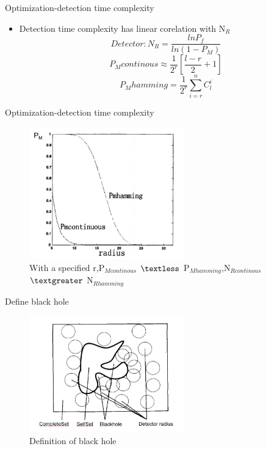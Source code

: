 \begin{frame}{Optimization-detection time complexity}
  \begin{itemize}
  \item{
     Detection time complexity has linear corelation with N$_R$\\
  \begin{equation}
     Detector:N_R=\frac{lnP_f}{ln(1-P_M)}
  \end{equation}  
  \begin{equation}
     P_Mcontinous \approx \frac{1}{2^r}[\frac{l-r}{2}+1]
  \end{equation}
  \begin{equation}
     P_Mhamming = \frac{1}{2^r}\sum_{i=r}^{n}C_l^i
  \end{equation}
 }
  \end{itemize}
\end{frame}

\begin{frame}{Optimization-detection time complexity}
  
  \begin{figure}[hb]
  \centering
  \includegraphics[width=0.6\textwidth]{img/CompareCH.jpg}
  \caption{With a specified r,P$_{Mcontinous}$ $\textless$ P$_{Mhamming}$,N$_{Rcontinous}$ $\textgreater$ N$_{Rhamming}$}
  \end{figure}
\end{frame}

\begin{frame}{Define black hole}
  \begin{figure}[hb]
  \centering
  \includegraphics[width=0.6\textwidth]{img/blackhole.jpg}
  \caption{Definition of black hole}
  \end{figure}
\end{frame}

